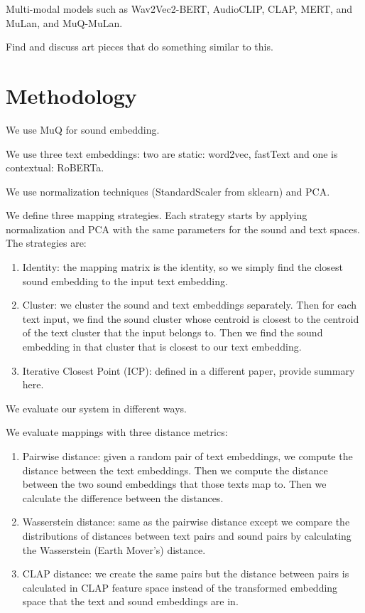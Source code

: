 \documentclass[twoside,a4paper]{article}
\begin{document}
Multi-modal models such as Wav2Vec2-BERT, AudioCLIP, CLAP, MERT, and MuLan, and MuQ-MuLan.

Find and discuss art pieces that do something similar to this.

\section{Methodology}
We use MuQ for sound embedding.

We use three text embeddings: two are static: word2vec, fastText and one is contextual: RoBERTa.

We use normalization techniques (StandardScaler from sklearn) and PCA.

We define three mapping strategies. Each strategy starts by applying normalization and PCA with the same parameters for the sound and text spaces. The strategies are:
\begin{enumerate}
    \item Identity: the mapping matrix is the identity, so we simply find the closest sound embedding to the input text embedding.
    \item Cluster: we cluster the sound and text embeddings separately. Then for each text input, we find the sound cluster whose centroid is closest to the centroid of the text cluster that the input belongs to. Then we find the sound embedding in that cluster that is closest to our text embedding.
    \item Iterative Closest Point (ICP): defined in a different paper, provide summary here.
\end{enumerate}

We evaluate our system in different ways.

We evaluate mappings with three distance metrics:
\begin{enumerate}
    \item Pairwise distance: given a random pair of text embeddings, we compute the distance between the text embeddings. Then we compute the distance between the two sound embeddings that those texts map to. Then we calculate the difference between the distances.
    \item Wasserstein distance: same as the pairwise distance except we compare the distributions of distances between text pairs and sound pairs by calculating the Wasserstein (Earth Mover’s) distance.
    \item CLAP distance: we create the same pairs but the distance between pairs is calculated in CLAP feature space instead of the transformed embedding space that the text and sound embeddings are in.
\end{enumerate}
\end{document}
